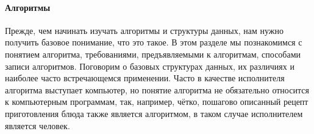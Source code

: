 \documentclass[fontsize=14bp]{report}
\begin{document}
\paragraph{Алгоритмы}
Прежде, чем начинать изучать алгоритмы и структуры данных, нам нужно получить базовое понимание, что это такое. В этом разделе мы познакомимся с понятием алгоритма, требованиями, предъявляемыми к алгоритмам, способами записи алгоритмов. Поговорим о базовых структурах данных, их различиях и наиболее часто встречающемся применении.
Часто в качестве исполнителя алгоритма выступает компьютер, но понятие алгоритма не обязательно относится к компьютерным программам, так, например, чётко, пошагово описанный рецепт приготовления блюда также является алгоритмом, в таком случае исполнителем является человек. 
\end{document}
